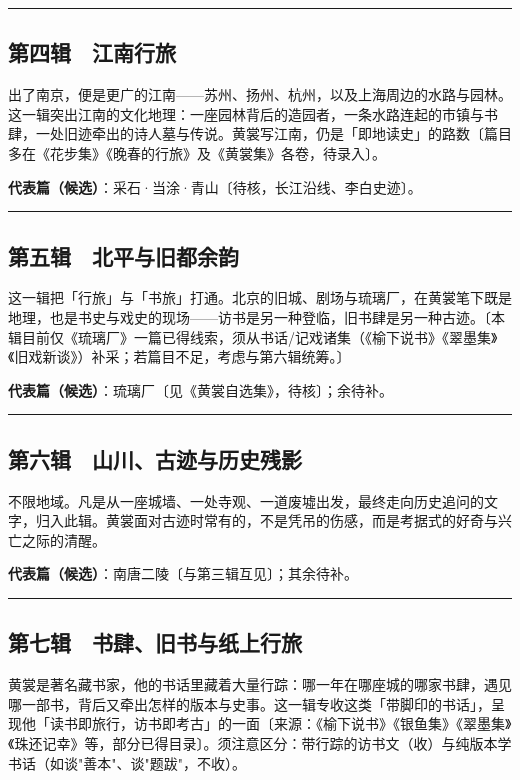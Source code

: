 \documentclass[UTF8,fontset=none,zihao=-4,a4paper]{ctexart}
\begin{document}
\medskip\hrule\medskip

\subsection{第四辑　江南行旅}


出了南京，便是更广的江南——苏州、扬州、杭州，以及上海周边的水路与园林。这一辑突出江南的文化地理：一座园林背后的造园者，一条水路连起的市镇与书肆，一处旧迹牵出的诗人墓与传说。黄裳写江南，仍是「即地读史」的路数〔篇目多在《花步集》《晚春的行旅》及《黄裳集》各卷，待录入〕。


\textbf{代表篇（候选）}：采石·当涂·青山〔待核，长江沿线、李白史迹〕。


\medskip\hrule\medskip

\subsection{第五辑　北平与旧都余韵}


这一辑把「行旅」与「书旅」打通。北京的旧城、剧场与琉璃厂，在黄裳笔下既是地理，也是书史与戏史的现场——访书是另一种登临，旧书肆是另一种古迹。〔本辑目前仅《琉璃厂》一篇已得线索，须从书话/记戏诸集（《榆下说书》《翠墨集》《旧戏新谈》）补采；若篇目不足，考虑与第六辑统筹。〕


\textbf{代表篇（候选）}：琉璃厂〔见《黄裳自选集》，待核〕；余待补。


\medskip\hrule\medskip

\subsection{第六辑　山川、古迹与历史残影}


不限地域。凡是从一座城墙、一处寺观、一道废墟出发，最终走向历史追问的文字，归入此辑。黄裳面对古迹时常有的，不是凭吊的伤感，而是考据式的好奇与兴亡之际的清醒。


\textbf{代表篇（候选）}：南唐二陵〔与第三辑互见〕；其余待补。


\medskip\hrule\medskip

\subsection{第七辑　书肆、旧书与纸上行旅}


黄裳是著名藏书家，他的书话里藏着大量行踪：哪一年在哪座城的哪家书肆，遇见哪一部书，背后又牵出怎样的版本与史事。这一辑专收这类「带脚印的书话」，呈现他「读书即旅行，访书即考古」的一面〔来源：《榆下说书》《银鱼集》《翠墨集》《珠还记幸》等，部分已得目录〕。须注意区分：带行踪的访书文（收）与纯版本学书话（如谈"善本"、谈"题跋"，不收）。
\end{document}
